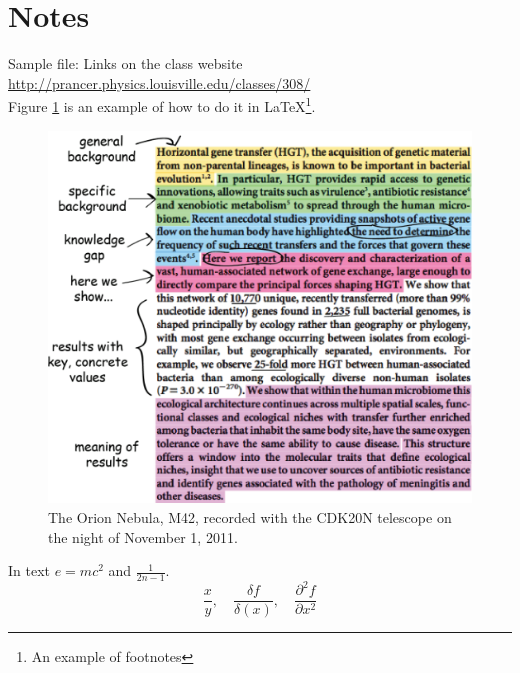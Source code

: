 
\newpage
\section{Notes}

Sample file: Links on the class website \url{http://prancer.physics.louisville.edu/classes/308/} \\
Figure \ref{fig:graph1} is an example of  how to do it in \LaTeX \footnote{An example of footnotes}.
\begin{figure}[h]  %
	\begin{center}
	\includegraphics[scale=0.5]{image/good_abstract.png}
	\end{center}
	\caption{The Orion Nebula, M42, recorded with the CDK20N telescope on the night of November 1, 2011.}
	\label{fig:graph1}
\end{figure}

In text $e=mc^2$ and $\frac{1}{2n-1}$.\\

\begin{equation}
\frac{x}{y}, \quad
\frac{\delta{f}}{\delta(x)},\quad
\frac{\partial^{2}{f}}{\partial{x}{^2}}
\end{equation}

   
\begin{center}

\end{center}

